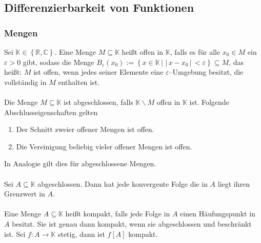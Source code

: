 \documentclass[a4paper,12pt]{article}
\begin{document}
\subsection{Differenzierbarkeit von Funktionen}
\subsubsection{Mengen}
Sei $\mathbb{K} \in \left\{\mathbb{R},\mathbb{C}\right\}$. Eine Menge $M\subseteq \mathbb{K}$ heißt offen in $\mathbb{K}$, falls es für alle $x_0 \in M$ ein $\varepsilon >0$ gibt, sodass die Menge $B_{\varepsilon }\left(x_0\right):=\left\{x \in \mathbb{K}\,|\, \,|\, x-x_0\,|\, <\varepsilon \right\}\subseteq M$, das heißt: $M$ ist offen, wenn jedes seiner Elemente eine $\varepsilon $--Umgebung besitzt, die vollständig in $M$ enthalten ist.\\\\ 
Die Menge $M\subseteq \mathbb{K}$ ist abgeschlossen, falls $\mathbb{K}\backslash M$ offen in $\mathbb{K}$ ist. Folgende Abschlusseigenschaften gelten
\begin{enumerate}[label=(\roman*)]
        \item Der Schnitt zweier offener Mengen ist offen.
        \item Die Vereinigung beliebig vieler offener Mengen ist offen.
\end{enumerate}
In Analogie gilt dies für abgeschlossene Mengen.\\\\
Sei $A\subseteq \mathbb{K}$ abgeschlossen. Dann hat jede konvergente Folge die in $A$ liegt ihren Grenzwert in $A$.\\\\
Eine Menge $A\subseteq \mathbb{K}$ heißt kompakt, falls jede Folge in $A$ einen Häufungspunkt in $A$ besitzt. Sie ist genau dann kompakt, wenn sie abgeschlossen und beschränkt ist. Sei $f:A\rightarrow \mathbb{K}$ stetig, dann ist $f[A]$ kompakt.
\end{document}
